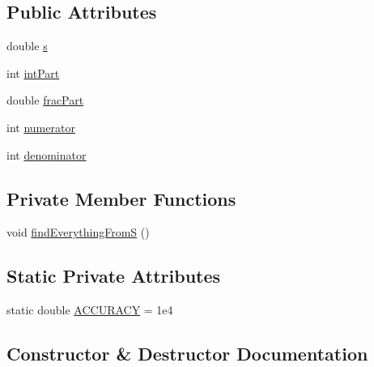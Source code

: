 \subsection*{Public Attributes}
\begin{DoxyCompactItemize}
\item 
double \hyperlink{class_p_c_a_1_1_polymer_scaling_1_1_scaling_param_a56665ea41c05361e104d28e6dd440f9b}{s}
\item 
int \hyperlink{class_p_c_a_1_1_polymer_scaling_1_1_scaling_param_affe9bd76db73798302bda975912cd832}{int\+Part}
\item 
double \hyperlink{class_p_c_a_1_1_polymer_scaling_1_1_scaling_param_af063b31dba882f79d92fe9ce4819b6a4}{frac\+Part}
\item 
int \hyperlink{class_p_c_a_1_1_polymer_scaling_1_1_scaling_param_a44e1207125e0e834313769714699b701}{numerator}
\item 
int \hyperlink{class_p_c_a_1_1_polymer_scaling_1_1_scaling_param_a379e56a2fc5fa7f2b96d213a6b23c065}{denominator}
\end{DoxyCompactItemize}
\subsection*{Private Member Functions}
\begin{DoxyCompactItemize}
\item 
void \hyperlink{class_p_c_a_1_1_polymer_scaling_1_1_scaling_param_a06540f05eef5e1dd4abbb17ff5b3ee9c}{find\+Everything\+FromS} ()
\end{DoxyCompactItemize}
\subsection*{Static Private Attributes}
\begin{DoxyCompactItemize}
\item 
static double \hyperlink{class_p_c_a_1_1_polymer_scaling_1_1_scaling_param_a2cdf697bc38e64e876a2d383bea33887}{A\+C\+C\+U\+R\+A\+CY} = 1e4
\end{DoxyCompactItemize}


\subsection{Constructor \& Destructor Documentation}
\hypertarget{class_p_c_a_1_1_polymer_scaling_1_1_scaling_param_ab7be79e64f74cafbac672e659925b8e2}{}\label{class_p_c_a_1_1_polymer_scaling_1_1_scaling_param_ab7be79e64f74cafbac672e659925b8e2} 
